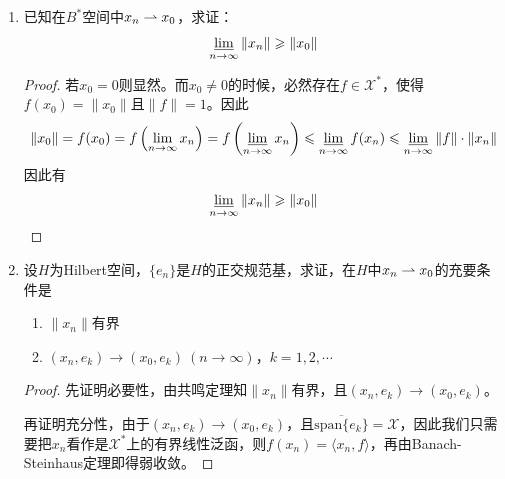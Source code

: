 \begin{enumerate}[leftmargin=2cm, label=\arabic*]
    \item 已知在$B^*$空间中$x_n\rightharpoonup x_0$，求证：
    \begin{align*}
        \varliminf\limits_{n\to\infty} \|x_n\| \geqslant \|x_0\|
    \end{align*}
    \begin{proof}
        若$x_0 = 0$则显然。而$x_0\neq 0$的时候，必然存在$f\in\mathscr{X}^*$，使得$f(x_0) = \|x_0\|$且$\|f\| = 1$。因此
        \begin{align*}
            \|x_0\| = f(x_0) = f\left(\lim\limits_{n\to\infty} x_n\right) = f\left(\varliminf\limits_{n\to\infty} x_n\right) \leqslant \varliminf\limits_{n\to\infty} f(x_n) \leqslant \varliminf\limits_{n\to\infty} \|f\| \cdot\|x_n\| 
        \end{align*}
        因此有
        \begin{align*}
            \varliminf\limits_{n\to\infty} \|x_n\| \geqslant \|x_0\|
        \end{align*}
    \end{proof}

    \item 设$H$为Hilbert空间，$\{e_n\}$是$H$的正交规范基，求证，在$H$中$x_n\rightharpoonup x_0$的充要条件是
    \begin{enumerate}[leftmargin=1cm, label=(\arabic*)]
        \item $\|x_n\|$有界
        \item $(x_n,e_k)\to (x_0,e_k)\ (n\to\infty)$，$k=1,2,\cdots$
    \end{enumerate}
    \begin{proof}
        先证明必要性，由共鸣定理知$\|x_n\|$有界，且$(x_n,e_k)\to (x_0,e_k)$。

        再证明充分性，由于$(x_n,e_k)\to (x_0,e_k)$，且$\overline{\text{span}\{e_k\}} = \mathscr{X}$，因此我们只需要把$x_n$看作是$\mathscr{X}^*$上的有界线性泛函，则$f(x_n) = \langle x_n,f \rangle$，再由Banach-Steinhaus定理即得弱收敛。
    \end{proof}


\end{enumerate}
